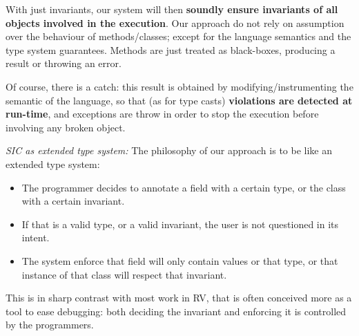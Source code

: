 With just invariants, our system will then 
\textbf{soundly ensure invariants of all objects involved in the execution}.
Our approach do not rely on assumption over the behaviour of methods/classes;
except for the language semantics and the type system guarantees.
Methods are just treated as black-boxes, producing a result or throwing an error.

Of course, there is a catch: this result is obtained by modifying/instrumenting the
semantic of the language, so that (as for type casts) \textbf{violations are detected at run-time}, and exceptions
are throw in order to stop the execution before involving any broken object.

\noindent\textit{SIC as extended type system:}
The philosophy of our approach is to be like an extended type system: 
\begin{itemize}
\item The programmer decides to annotate a field with a certain type, or the class with a certain invariant.
\item If that is a valid type, or a valid invariant, the user is not questioned in its intent.
\item The system enforce that field will only contain values or that type, or that instance of that class
will respect that invariant.
\end{itemize}
This is in sharp contrast with most work in RV, that is often conceived more as a tool to ease debugging:
both deciding the invariant and enforcing it is controlled by the programmers.
